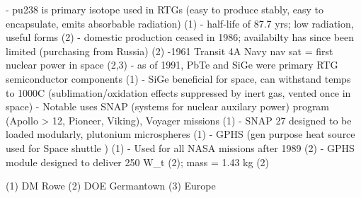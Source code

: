 \documentclass{report}
\begin{document}
- pu238 is primary isotope used in RTGs (easy to produce stably, easy to encapsulate, emits absorbable radiation) (1)
- half-life of 87.7 yrs; low radiation, useful forms (2)
- domestic production ceased in 1986; availabilty has since been limited (purchasing from Russia) (2)
-1961 Transit 4A Navy nav sat = first nuclear power in space (2,3)
- as of 1991, PbTe and SiGe were primary RTG semiconductor components (1)
- SiGe beneficial for space, can withstand temps to 1000C (sublimation/oxidation effects suppressed by inert gas, vented once in space)
- Notable uses SNAP (systems for nuclear auxilary power) program (Apollo > 12, Pioneer, Viking), Voyager missions (1)
- SNAP 27 designed to be loaded modularly, plutonium microspheres (1)
- GPHS (gen purpose heat source used for Space shuttle ) (1)
- Used for all NASA missions after 1989 (2)
- GPHS module designed to deliver 250 W_t (2); mass = 1.43 kg (2)



(1) DM Rowe
(2) DOE Germantown
(3) Europe
\end{document}
